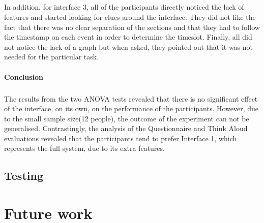 \documentclass{l4proj}
\begin{document}
\paragraph{}
In addition, for interface 3, all of the participants directly noticed the lack of features and started looking for clues around the interface. They did not like the fact that there was no clear separation of the sections and that they had to follow the timestamp on each event in order to determine the timeslot. Finally, all did not notice the lack of a graph but when asked, they pointed out that it was not needed for the particular task.

\subsubsection{Conclusion}
\paragraph{}
The results from the two ANOVA tests revealed that there is no significant effect of the interface, on its own, on the performance of the participants. However, due to the small sample size(12 people), the outcome of the experiment can not be generalised. Contrastingly, the analysis of the Questionnaire and Think Aloud evaluations revealed that the participants tend to prefer Interface 1, which represents the full system, due to its extra features.      

\section{Testing}

\chapter{Future work}

\begin{appendices}

\end{appendices}




\end{document}

